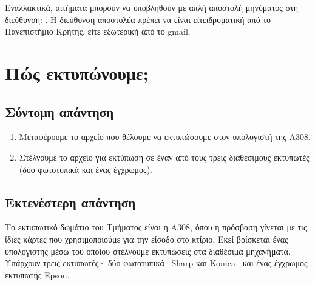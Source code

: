 \documentclass[letterpaper,10pt,greek]{sphinxhowto}
\begin{document}
\sphinxAtStartPar
Εναλλακτικά, αιτήματα μπορούν να υποβληθούν με απλή αποστολή
μηνύματος στη διεύθυνση: .
Η διεύθυνση αποστολέα πρέπει να είναι είτειδρυματική από το
Πανεπιστήμιο Κρήτης, είτε εξωτερική από το gmail.

\sphinxstepscope


\section{Πώς εκτυπώνουμε;}
\label{\detokenize{HowToPrint:id1}}\label{\detokenize{HowToPrint::doc}}

\subsection{Σύντομη απάντηση}
\label{\detokenize{HowToPrint:id2}}\begin{enumerate}
%
\item {} 
\sphinxAtStartPar
Μεταφέρουμε το αρχείο που θέλουμε να εκτυπώσουμε στον υπολογιστή της Α308.

\item {} 
\sphinxAtStartPar
Στέλνουμε το αρχείο για εκτύπωση σε έναν από τους τρεις διαθέσιμους εκτυπωτές (δύο φωτοτυπικά και ένας έγχρωμος).

\end{enumerate}


\subsection{Εκτενέστερη απάντηση}
\label{\detokenize{HowToPrint:id3}}
\sphinxAtStartPar
Το εκτυπωτικό δωμάτιο του Τμήματος είναι η Α308, όπου η πρόσβαση γίνεται με τις ίδιες κάρτες που χρησιμοποιούμε για την είσοδο στο κτίριο. Εκεί βρίσκεται ένας υπολογιστής μέσω του οποίου στέλνουμε εκτυπώσεις στα διαθέσιμα μηχανήματα. Υπάρχουν τρεις εκτυπωτές· δύο φωτοτυπικά –Sharp και Konica– και ένας έγχρωμος εκτυπωτής Epson.
\end{document}
